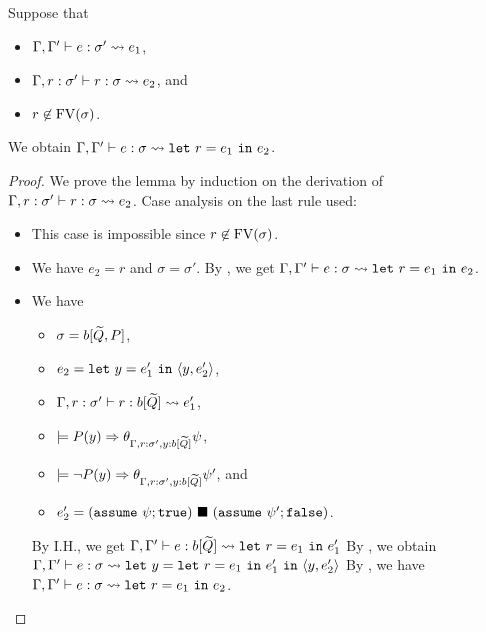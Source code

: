 \begin{lemma}
\label{lem:subb}
Suppose that
\begin{itemize}
\item \(\Gamma,\Gamma' \vdash e : \sigma' \leadsto e_1\),
\item \(\Gamma,r:\sigma' \vdash r : \sigma \leadsto e_2\), and
\item \(r \not\in \mathrm{FV}(\sigma)\).
\end{itemize}
We obtain \(\Gamma,\Gamma' \vdash e : \sigma \leadsto \mathtt{let~}r=e_1\mathtt{~in~}{e_2}\).
\end{lemma}
\begin{proof}
We prove the lemma by induction on the derivation of \(\Gamma,r:\sigma' \vdash r : \sigma \leadsto e_2\).
Case analysis on the last rule used:
\begin{itemize}
\item[]  This case is impossible since \(r \not\in \mathrm{FV}(\sigma)\).

\item[] 
We have \(e_2=r\) and \(\sigma=\sigma'\).
By , we get
\(\Gamma,\Gamma' \vdash e : \sigma \leadsto \mathtt{let~}r=e_1\mathtt{~in~}{e_2}\).

\item[] 
We have
\begin{itemize}
\item \(\sigma=b[\widetilde{Q},P]\),
\item \(e_2=\mathtt{let~}y=e_1'\mathtt{~in~}{\langle{y,e_2'}\rangle}\),
\item \(\Gamma,r:\sigma' \vdash r : b[\widetilde{Q}] \leadsto e_1'\),
\item \(\models P(y) \Rightarrow \theta_{\Gamma,r:\sigma',y:b[\widetilde{Q}]}\psi\),
\item \(\models \neg P(y) \Rightarrow \theta_{\Gamma,r:\sigma',y:b[\widetilde{Q}]}\psi'\), and
\item \(e_2'=(\mathtt{assume~}\psi; \mathtt{true})\ \blacksquare\ (\mathtt{assume~}\psi'; \mathtt{false})\).
\end{itemize}
By I.H., we get
\(\Gamma,\Gamma' \vdash e : b[\widetilde{Q}] \leadsto \mathtt{let~}r=e_1\mathtt{~in~}{e_1'}\)
By , we obtain
\(\Gamma,\Gamma' \vdash e : \sigma \leadsto \mathtt{let~}y=\mathtt{let~}r=e_1\mathtt{~in~}{e_1'}\mathtt{~in~}{\langle{y,e_2'}\rangle}\)
By , we have
\(\Gamma,\Gamma' \vdash e : \sigma \leadsto \mathtt{let~}r=e_1\mathtt{~in~}{e_2}\).


\end{itemize}
\end{proof}
